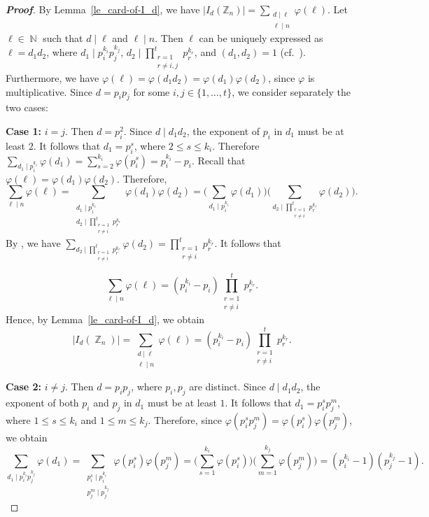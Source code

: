 \documentclass{amsart}
\theoremstyle{plain}
\theoremstyle{definition}
\DeclareMathOperator{\N}{\mathbb{N}}
\DeclareMathOperator{\Z}{\mathbb{Z}}
\begin{document}
\begin{proof}[\textbf{Proof}]
By Lemma~\ref{le_card-of-I_d}, we have $|I_d(\mathbb{Z}_n)| = \sum_{\substack{d\mid \ell\\ \ell\mid n}}\varphi(\ell)$. Let $\ell\in \N$ such that $d\mid \ell$ and $\ell\mid n$. Then $\ell$ can be uniquely expressed as $\ell = d_1 d_2$, where $d_{1}\mid p_{i}^{k_i} p_{j}^{k_j}$, $d_2 \mid \prod_{\substack{r=1\\r\neq i,j}}^{t}p_r^{k_r}$, and $(d_1, d_2) = 1$ (cf.~\cite[p.~108, Lemma]{burton-b07}). Furthermore, we have $\varphi(\ell) = \varphi(d_1 d_2) = \varphi(d_1)\varphi(d_2)$, since $\varphi$ is multiplicative. Since $d = p_ip_j$ for some $i,j\in \{1,\ldots, t\}$, we consider separately the two cases: 

\vspace{0.5mm}
\noindent\textbf{Case 1:} $i=j$. Then $d = p_{i}^{2}$. Since $d\mid d_1d_2$, the exponent of $p_i$ in $d_1$ must be at least $2$. It follows that $d_1 = p_i^{s}$, where $2 \leq s \leq k_{i}$. Therefore $\sum_{d_1 \mid p_{i}^{k_i}}\varphi(d_1) = \sum_{s=2}^{k_i}\varphi(p_i^{s}) = p_i^{k_i} - p_i$. Recall that $\varphi(\ell) = \varphi(d_1)\varphi(d_2)$. Therefore, 
\[\sum_{\ell\mid n}\varphi(\ell)= \sum_{\substack{d_{1}\mid p_{i}^{k_i} \\ d_2 \mid \prod_{\substack{r=1\\r\neq i}}^{t}p_r^{k_r}}} \varphi(d_1) \varphi(d_2) =\biggl(\sum_{d_1 \mid p_{i}^{k_i}}\varphi(d_1)\biggr) \biggl(\sum_{d_2\mid \prod_{\substack{r=1\\r\neq i}}^{t}p_r^{k_r}}\varphi(d_2)\biggr).\]
By \cite[Theorem~7.6]{burton-b07}, we have $\sum_{d_2\mid \prod_{\substack{r=1\\r\neq i}}^{t}p_r^{k_r}}\varphi(d_2) = \prod_{\substack{r=1\\r\neq i}}^{t}p_r^{k_r}$. It follows that

\[\sum_{\ell\mid n}\varphi(\ell)=(p_i^{k_i}-p_i)\prod_{\substack{r=1\\r\neq i}}^{t}p_r^{k_r}.\]
Hence, by Lemma~\ref{le_card-of-I_d}, we obtain
\[|I_{d}(\Z_{n})| = \sum_{\substack{d \mid \ell \\ \ell \mid n}} \varphi(\ell)= (p_i^{k_i}-p_i)\prod_{\substack{r=1\\r\neq i}}^{t}p_r^{k_r}.\]  

\vspace{0.5mm}
\noindent\textbf{Case 2:} $i\neq j$. Then $d = p_{i} p_{j}$, where $p_i, p_j$ are distinct. Since $d\mid d_1d_2$, the exponent of both $p_i$ and $p_j$ in $d_1$ must be at least $1$. It follows that $d_1 = p_i^{s}  p_j^{m}$, where $1 \leq s \leq k_i$ and $1 \leq m \leq k_j$. Therefore, since $\varphi(p_i^{s}  p_j^{m}) = \varphi(p_i^{s})\varphi(p_j^{m})$, we obtain
\[\sum_{d_1 \mid p_{i}^{k_i} p_{j}^{k_j}}\varphi(d_1)  =
\sum_{\substack{p_i^{s} \mid p_i^{k_i} \\ p_j^{m} \mid p_j^{k_j}}} \varphi(p_i^{s}) \varphi(p_j^{m})=\biggl(\sum_{s=1}^{k_i}\varphi(p_i^s)\biggr) \biggl(\sum_{m=1}^{k_j}\varphi(p_j^m)\biggr)= (p_i^{k_i} - 1) (p_j^{k_j} - 1).\]


\end{proof}
\end{document}
